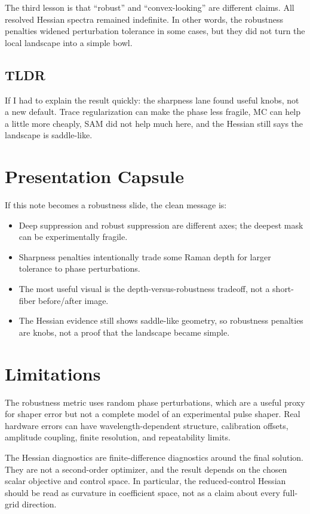 \documentclass[11pt]{article}
\begin{document}
The third lesson is that ``robust'' and ``convex-looking'' are different
claims. All resolved Hessian spectra remained indefinite. In other words, the
robustness penalties widened perturbation tolerance in some cases, but they did
not turn the local landscape into a simple bowl.

\subsection*{TLDR}

If I had to explain the result quickly: the sharpness lane found useful knobs,
not a new default. Trace regularization can make the phase less fragile, MC can
help a little more cheaply, SAM did not help much here, and the Hessian still
says the landscape is saddle-like.

\section{Presentation Capsule}

If this note becomes a robustness slide, the clean message is:
\begin{itemize}
    \item Deep suppression and robust suppression are different axes; the deepest mask can be experimentally fragile.
    \item Sharpness penalties intentionally trade some Raman depth for larger tolerance to phase perturbations.
    \item The most useful visual is the depth-versus-robustness tradeoff, not a short-fiber before/after image.
    \item The Hessian evidence still shows saddle-like geometry, so robustness penalties are knobs, not a proof that the landscape became simple.
\end{itemize}

\section{Limitations}

The robustness metric uses random phase perturbations, which are a useful proxy
for shaper error but not a complete model of an experimental pulse shaper.
Real hardware errors can have wavelength-dependent structure, calibration
offsets, amplitude coupling, finite resolution, and repeatability limits.

The Hessian diagnostics are finite-difference diagnostics around the final
solution. They are not a second-order optimizer, and the result depends on the
chosen scalar objective and control space. In particular, the reduced-control
Hessian should be read as curvature in coefficient space, not as a claim about
every full-grid direction.
\end{document}
